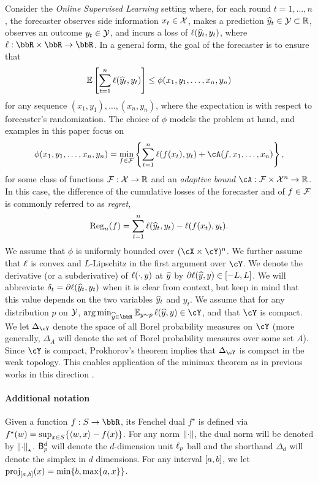 Consider the \emph{Online Supervised Learning} setting where, for each round $t=1,\ldots,n$, the forecaster observes side information $x_t\in\X$, makes a prediction $\pred_t\in\Y\subset \reals$, observes an outcome $y_t\in\Y$, and incurs a loss of $\loss(\pred_t,y_t)$, where $\ls:\bbR\times{}\bbR\to\bbR$. In a general form, the goal of the forecaster is to ensure that
\begin{align}
	\label{eq:def_phi_regret}
	\En\left[\sum_{t=1}^n \loss(\pred_t,y_t)\right] \leq \phi(x_1,y_1,\ldots,x_n,y_n)
\end{align}
for any sequence $(x_1,y_1),\ldots,(x_n,y_n)$, where the expectation is with respect to forecaster's randomization. The choice of $\phi$ models the problem at hand, and examples in this paper focus on
\begin{align}
	\label{eq:phi_comp_adap}
	\phi(x_1,y_1,\ldots,x_n,y_n) = \min_{f\in\F} \left\{ \sum_{t=1}^n \loss(f(x_t),y_t) + \cA(f, x_1,\ldots,x_n)\right\},
\end{align}
for some class of functions $\F:\X\to\reals$ and an \emph{adaptive bound} $\cA:\F\times\X^n\to\reals$. In this case, the difference of the cumulative losses of the forecaster and of $f\in\F$ is commonly referred to as \emph{regret},
$$\reg(f) = \sum_{t=1}^n\loss(\pred_t,y_t)-\loss(f(x_t),y_t).$$
We assume that $\phi$ is uniformly bounded over $(\cX\times{}\cY)^{n}$. We further assume that $\loss$ is convex and $L$-Lipschitz in the first argument over $\cY$. We denote the derivative (or a subderivative) of $\loss(\cdot,y)$ at $\pred$ by $\partial \loss(\pred,y)\in[-L,L]$. We will abbreviate $\delta_t = \partial\loss(\pred_t,y_t)$ when it is clear from context, but keep in mind that this value depends on the two variables $\yh_t$ and $y_t$. 
We assume that for any distribution $p$ on $\Y$, $\arg\min_{\pred\in\bbR} \En_{y \sim p}\loss(\pred,y) \in \cY$, and that $\cY$ is compact. We let $\Delta_{\cY}$ denote the space of all Borel probability measures on $\cY$ (more generally, $\Delta_{A}$ will denote the set of Borel probability measures over some set $A$). Since $\cY$ is compact, Prokhorov's theorem implies that $\Delta_{\cY}$ is compact in the weak topology. This enables application of the minimax theorem as in previous works in this direction \citep{RakSriTew10,RakSriTew14jmlr,FosRakSri15}.

\paragraph{Additional notation}
 Given a function $f:S\to\bbR$, its Fenchel dual $f^{\star}$ is defined via $f^{\star}(w) = \sup_{x\in{}S}\crl*{\tri*{w,x}-f(x)}$. For any norm $\nrm*{\cdot}$, the dual norm will be denoted by $\nrm*{\cdot}_{\star}$. $\sB_p^d$ will denote the $d$-dimension unit $\ls_p$ ball and the shorthand $\Delta_{d}$ will denote the simplex in $d$ dimensions. For any interval $\brk*{a,b}$, we let $\mathrm{proj}_{\brk*{a,b}}(x) = \min\crl*{b, \max\crl*{a, x}}$.

